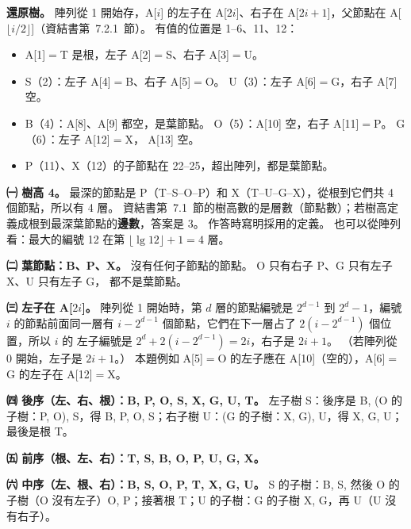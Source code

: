 \begin{pastsoln}
\textbf{還原樹。} 陣列從 1 開始存，A[$i$] 的左子在 A[$2i$]、右子在 A[$2i+1$]，父節點在
A[$\lfloor i/2 \rfloor$]（資結書第~7.2.1~節）。 有值的位置是 1--6、11、12：
\begin{itemize}
\item A[1]$=$T 是根，左子 A[2]$=$S、右子 A[3]$=$U。
\item S（2）：左子 A[4]$=$B、右子 A[5]$=$O。 U（3）：左子 A[6]$=$G，右子 A[7] 空。
\item B（4）：A[8]、A[9] 都空，是葉節點。 O（5）：A[10] 空，右子 A[11]$=$P。 G（6）：左子 A[12]$=$X，
A[13] 空。
\item P（11）、X（12）的子節點在 22--25，超出陣列，都是葉節點。
\end{itemize}
\begin{center}
\end{center}

\textbf{㈠ 樹高 4。} 最深的節點是 P（T--S--O--P）和 X（T--U--G--X），從根到它們共 4 個節點，所以有
4 層。 資結書第~7.1~節的樹高數的是層數（節點數）；若樹高定義成根到最深葉節點的\textbf{邊數}，答案是 3。
作答時寫明採用的定義。 也可以從陣列看：最大的編號 12 在第 $\lfloor \lg 12 \rfloor + 1 = 4$ 層。

\textbf{㈡ 葉節點：B、P、X。} 沒有任何子節點的節點。 O 只有右子 P、G 只有左子 X、U 只有左子 G，
都不是葉節點。

\textbf{㈢ 左子在 A[$2i$]。} 陣列從 1 開始時，第 $d$ 層的節點編號是 $2^{d-1}$ 到 $2^d - 1$，編號
$i$ 的節點前面同一層有 $i - 2^{d-1}$ 個節點，它們在下一層占了 $2(i - 2^{d-1})$ 個位置，所以 $i$ 的
左子編號是 $2^d + 2(i - 2^{d-1}) = 2i$，右子是 $2i + 1$。 （若陣列從 0 開始，左子是 $2i + 1$。）
本題例如 A[5]$=$O 的左子應在 A[10]（空的），A[6]$=$G 的左子在 A[12]$=$X。

\textbf{㈣ 後序（左、右、根）：B, P, O, S, X, G, U, T。}
左子樹 S：後序是 B, (O 的子樹：P, O), S，得 B, P, O, S；右子樹 U：(G 的子樹：X, G), U，得 X, G, U；
最後是根 T。

\textbf{㈤ 前序（根、左、右）：T, S, B, O, P, U, G, X。}

\textbf{㈥ 中序（左、根、右）：B, S, O, P, T, X, G, U。}
S 的子樹：B, S, 然後 O 的子樹（O 沒有左子）O, P；接著根 T；U 的子樹：G 的子樹 X, G，再 U（U 沒有右子）。
\end{pastsoln}
